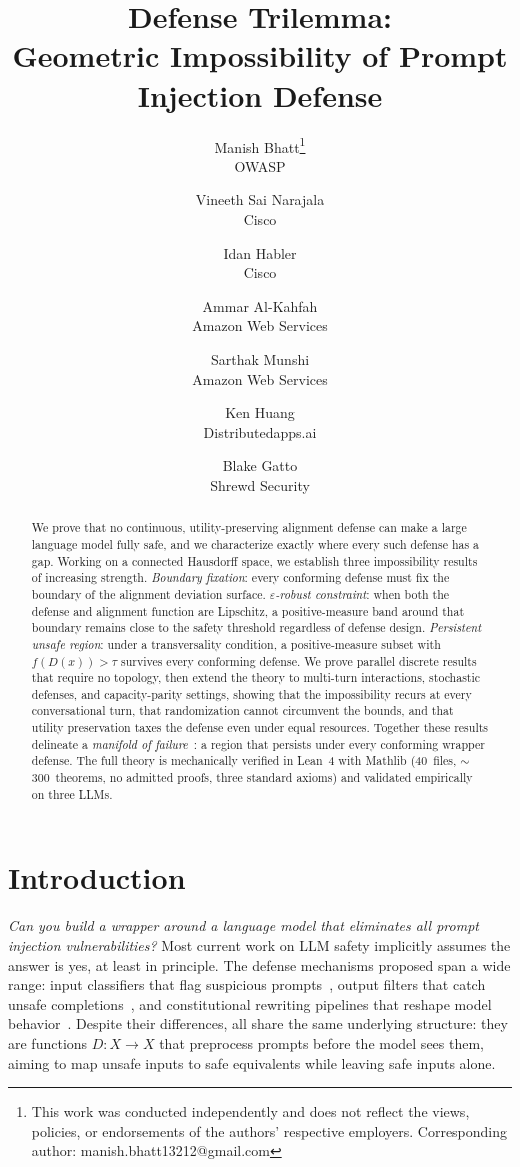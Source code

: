 \documentclass[11pt]{article}
\title{Defense Trilemma:\\
  Geometric Impossibility of Prompt Injection Defense}
\author{
    {\rm Manish Bhatt\thanks{This work was conducted independently and does not reflect the views, policies, or endorsements of the
  authors' respective employers. Corresponding author: manish.bhatt13212@gmail.com}}\textsuperscript{\space}\footnotemark[2]\\
    OWASP
  \and
  {\rm Vineeth Sai Narajala}\footnotemark[2]\\
  Cisco
  \and
  {\rm Idan Habler}\footnotemark[2]\\
  Cisco
  \and
  {\rm Ammar Al-Kahfah}\footnotemark[2]\\
  Amazon Web Services
  \and
  {\rm Sarthak Munshi}\footnotemark[2]\\
    Amazon Web Services
    \and
  {\rm Ken Huang}\\
  Distributedapps.ai
  \and
  {\rm Blake Gatto}\\
  Shrewd Security
  }
\date{}
\begin{document}
\maketitle
\renewcommand{\thefootnote}{\fnsymbol{footnote}}
\begin{abstract}

We prove that no continuous, utility-preserving alignment defense can
make a large language model fully safe, and we characterize exactly
where every such defense has a gap. Working on a connected Hausdorff
space, we establish three impossibility results of increasing strength.
\emph{Boundary fixation}: every conforming defense must fix the
boundary of the alignment deviation surface. \emph{$\varepsilon$-robust
constraint}: when both the defense and alignment function are Lipschitz,
a positive-measure band around that boundary remains close to the safety
threshold regardless of defense design. \emph{Persistent unsafe region}:
under a transversality condition, a positive-measure subset with
$f(D(x))>\tau$ survives every conforming defense. We prove parallel
discrete results that require no topology, then extend the theory to
multi-turn interactions, stochastic defenses, and capacity-parity
settings, showing that the impossibility recurs at every conversational
turn, that randomization cannot circumvent the bounds, and that utility
preservation taxes the defense even under equal resources. Together
these results delineate a \emph{manifold of failure}~\cite{munshi2026manifold}: a
region that persists under every conforming wrapper defense. The full theory is mechanically verified
in Lean~4 with Mathlib (40~files, $\sim$300~theorems, no admitted
proofs, three standard axioms) and validated empirically on three LLMs.

\end{abstract}

\section{Introduction}
\label{sec:intro}

\emph{Can you build a wrapper around a language model that eliminates all
prompt injection vulnerabilities?} Most current work on LLM safety
implicitly assumes the answer is yes, at least in principle. The defense
mechanisms proposed span a wide range: input classifiers that flag
suspicious prompts~\cite{alon2023detecting}, output filters that catch
unsafe completions~\cite{inan2023llama}, and constitutional rewriting
pipelines that reshape model behavior~\cite{bai2022constitutional}. Despite
their differences, all share the same underlying structure: they are
functions $D\colon X \to X$ that preprocess prompts before the model
sees them, aiming to map unsafe inputs to safe equivalents while leaving
safe inputs alone.
\end{document}
